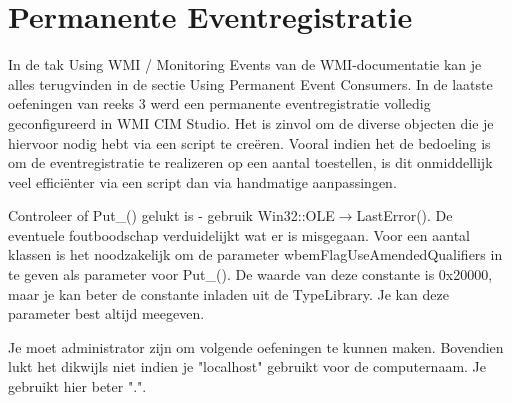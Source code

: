 \documentclass[11pt,a4paper]{report}
\begin{document}
\section{Permanente Eventregistratie}
In de tak Using WMI / Monitoring Events van de WMI-documentatie kan je alles terugvinden in de sectie Using Permanent Event Consumers.
In de laatste oefeningen van reeks 3 werd een permanente eventregistratie volledig geconfigureerd in WMI CIM Studio. Het is zinvol om de diverse objecten die je hiervoor nodig hebt via een script te creëren. Vooral indien het de bedoeling is om de eventregistratie te realizeren op een aantal toestellen, is dit onmiddellijk veel efficiënter via een script dan via handmatige aanpassingen.
\par Controleer of Put\_() gelukt is - gebruik Win32::OLE$\rightarrow$LastError(). De eventuele foutboodschap verduidelijkt wat er is misgegaan.
Voor een aantal klassen is het noodzakelijk om de parameter wbemFlagUseAmendedQualifiers in te geven als parameter voor Put\_(). De waarde van deze constante is 0x20000, maar je kan beter de constante inladen uit de TypeLibrary.
Je kan deze parameter best altijd meegeven.
\par Je moet administrator zijn om volgende oefeningen te kunnen maken. Bovendien lukt het dikwijls niet indien je "localhost" gebruikt voor de computernaam. Je gebruikt hier beter ".".
\end{document}
